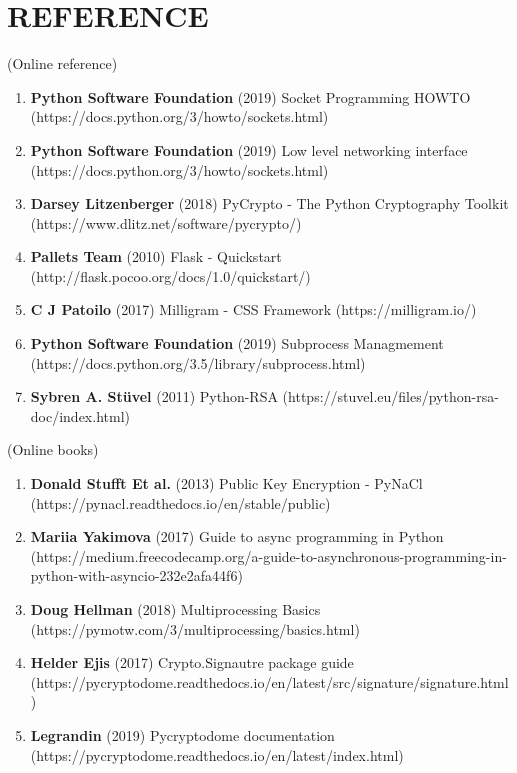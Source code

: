 \chapter*{\rm \large \bf REFERENCE}
\vspace{4.0mm}
\setlength{\parindent}{1cm} 

\scriptsize{(Online reference)}
\begin{enumerate}
    \item \textbf{Python Software Foundation} (2019) Socket Programming HOWTO
        (https://docs.python.org/3/howto/sockets.html)

    \item \textbf{Python Software Foundation} (2019) Low level networking
        interface (https://docs.python.org/3/howto/sockets.html)

    \item \textbf{Darsey Litzenberger} (2018) PyCrypto - The Python Cryptography
        Toolkit (https://www.dlitz.net/software/pycrypto/)

    \item \textbf{Pallets Team} (2010) Flask - Quickstart
        (http://flask.pocoo.org/docs/1.0/quickstart/)

    \item \textbf{C J Patoilo} (2017) Milligram - CSS Framework
        (https://milligram.io/)

    \item \textbf{Python Software Foundation} (2019) Subprocess Managmement
        (https://docs.python.org/3.5/library/subprocess.html)

    \item \textbf{Sybren A. Stüvel} (2011) Python-RSA
        (https://stuvel.eu/files/python-rsa-doc/index.html)
\end{enumerate}

\scriptsize{(Online books)}
\begin{enumerate}
    \item \textbf{Donald Stufft Et al.} (2013) Public Key Encryption - PyNaCl
        (https://pynacl.readthedocs.io/en/stable/public)

    \item \textbf{Mariia Yakimova} (2017) Guide to async programming in Python
        (https://medium.freecodecamp.org/a-guide-to-asynchronous-programming-in-python-with-asyncio-232e2afa44f6)

    \item \textbf{Doug Hellman} (2018) Multiprocessing Basics
        (https://pymotw.com/3/multiprocessing/basics.html)

    \item \textbf{Helder Ejis} (2017) Crypto.Signautre package guide
        (https://pycryptodome.readthedocs.io/en/latest/src/signature/signature.html)

    \item \textbf{Legrandin} (2019) Pycryptodome documentation
        (https://pycryptodome.readthedocs.io/en/latest/index.html)
\end{enumerate}

\newpage
